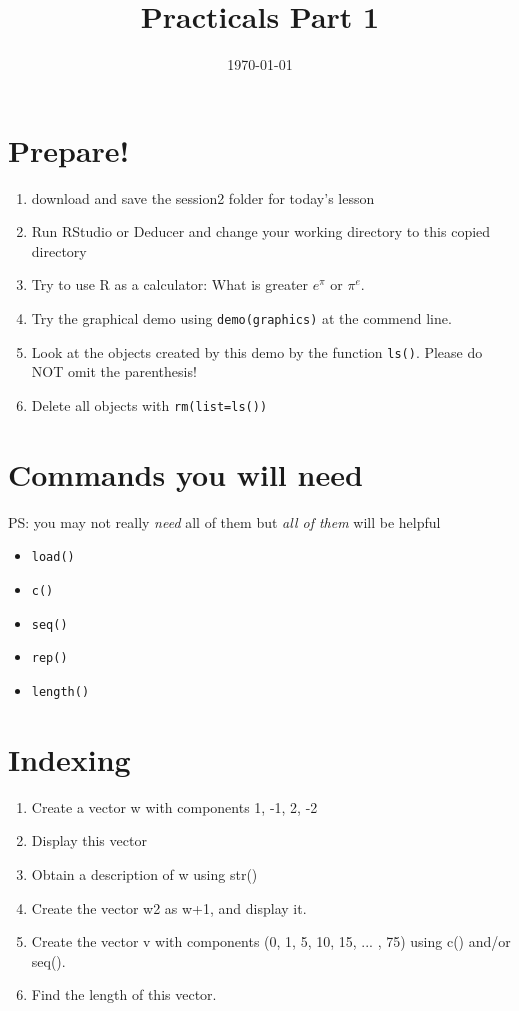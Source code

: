 \documentclass[12pt]{article}
\begin{document}
\title{Practicals Part 1}
\author{}
\date{\today}
\maketitle

\section{Prepare!}
\begin{enumerate}
\item download and save the session2 folder for today's lesson
\item Run RStudio or Deducer and change your working directory to this copied directory
\item Try to use R as a calculator: What is greater $e^{\pi}$ or $\pi^{e}$.
\item Try the graphical demo using \texttt{demo(graphics)} at the commend line.
\item Look at the objects created by this demo by the function \texttt{ls()}. Please do NOT omit the parenthesis!
\item Delete all objects with \texttt{rm(list=ls())}
\end{enumerate}


\section{Commands you will need}
PS: you may not really \textit{need} all of them but \textit{all of them} will be helpful
\begin{itemize}
\item \texttt{load()}
\item \texttt{c()}
\item \texttt{seq()}
\item \texttt{rep()}
\item \texttt{length()}
\end{itemize}

\section{Indexing}
\begin{enumerate}
\item Create a vector w with components 1, -1, 2, -2
\item Display this vector
\item Obtain a description of w using str()
\item Create the vector w2 as w+1, and display it.
\item Create the vector v with components (0, 1, 5, 10, 15, ... , 75) using c() and/or seq().
\item Find the length of this vector.
\end{enumerate}
\end{document}
